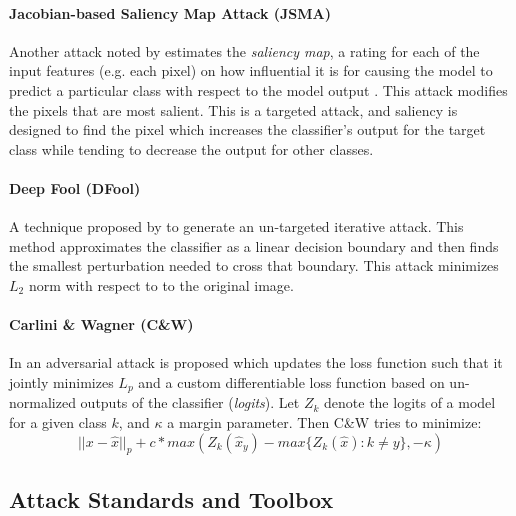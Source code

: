 \paragraph{Jacobian-based Saliency Map Attack (JSMA)} Another attack noted by  \cite{papernot_limitations_2015}
  estimates the \emph{saliency map}, a rating for each of the input features (e.g. each pixel) on how influential it is for causing the model to predict a particular class with respect to the model output \cite{wiyatno2018saliency}. This attack modifies the pixels that are most salient. This is a targeted attack, and saliency is designed to find the pixel which increases the classifier's output for the target class while tending to decrease the output for other classes.

\paragraph{Deep Fool (DFool)} A technique proposed by \cite{moosavi-dezfooli_deepfool:_2015}
  to generate an un-targeted iterative attack. 
This method approximates the classifier as a linear decision boundary and then finds the smallest perturbation needed to cross that boundary.
This attack minimizes $L_2$ norm with respect to  to the original image.

\paragraph{Carlini \& Wagner (C\&W)} In \cite{carlini_towards_2016}
  an adversarial attack is proposed which updates the loss function such that it jointly minimizes $L_p$ and a custom differentiable loss function based on un-normalized outputs of the classifier (\textit{logits}). 
Let $Z_k$ denote the logits of a model for a given class $k$, and $\kappa$ a margin parameter. Then C\&W tries to minimize:
\begin{equation}
|| x - \hat{x} ||_p + c* max\left(Z_k(\hat{x}_y) - max\{Z_k(\hat{x}) : k \neq y\},-\kappa\right)
\end{equation}

\subsection{Attack Standards and Toolbox}

